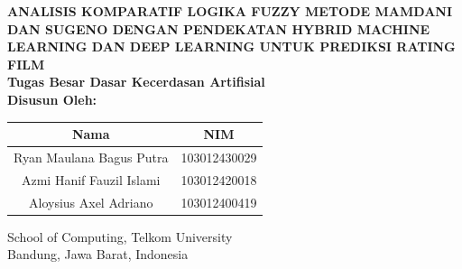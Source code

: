 \documentclass[11pt,a4paper]{article}
\begin{document}
\begin{center}
    \large\bfseries ANALISIS KOMPARATIF LOGIKA FUZZY METODE MAMDANI DAN SUGENO DENGAN PENDEKATAN HYBRID MACHINE LEARNING DAN DEEP LEARNING UNTUK PREDIKSI RATING FILM\\
    \vspace{0.4cm}
    \small\mdseries Tugas Besar Dasar Kecerdasan Artifisial\\
    \vspace{0.5cm}
    \textbf{Disusun Oleh:}
    \vspace{0.2cm}
    
    \begin{tabular}{cc}
        \textbf{Nama} & \textbf{NIM} \\
        \hline
        Ryan Maulana Bagus Putra & 103012430029 \\
        Azmi Hanif Fauzil Islami & 103012420018 \\
        Aloysius Axel Adriano & 103012400419 \\
    \end{tabular}
    
    \vspace{0.6cm}
    \small School of Computing, Telkom University \\
    Bandung, Jawa Barat, Indonesia\\
\end{center}

\vspace{0.4cm}
\end{document}
